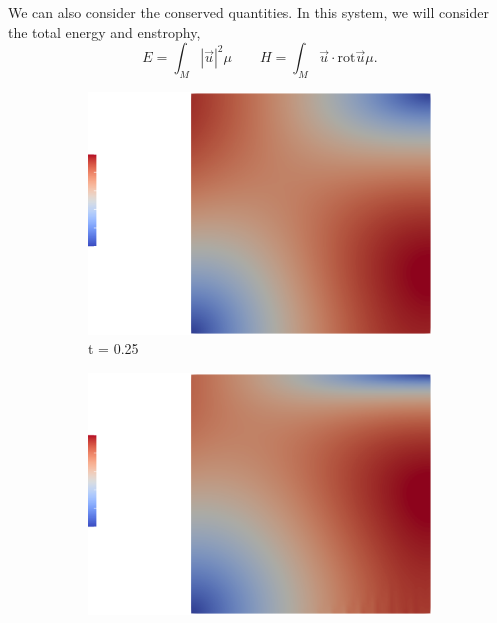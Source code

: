 \noindent
We can also consider the conserved quantities. In this system, we will consider the total energy and enstrophy,
$$ E = \int_M |\vec u|^2\mu \qquad H = \int_M \vec u \cdot \mathrm{rot} \vec u\mu . $$

\begin{figure}
    \centering
    \begin{subfigure}[b]{0.475\textwidth}
        \centering
        \includegraphics[trim={5cm 0 5cm 0}, clip,width=\textwidth]{./img/25.eps}
        \caption[Network2]%
        {{\small t = 0.25}}
        \label{fig:0.25}
    \end{subfigure}
    \hfill
    \begin{subfigure}[b]{0.475\textwidth}
        \centering
        \includegraphics[trim={5cm 0 5cm 0}, clip,width=\textwidth]{./img/50.eps}

\end{subfigure}
\end{figure}
